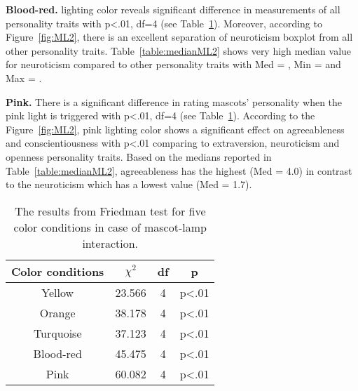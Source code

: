 \par\textbf{Blood-red.}
lighting color reveals significant difference in measurements of all personality traits
with p<.01, df=4 (see Table~\ref{table:friedmanML2}).
Moreover, according to Figure~\ref{fig:ML2}, there is an excellent separation of neuroticism boxplot from all other personality traits.
Table~\ref{table:medianML2} shows very high median value for neuroticism compared to other
personality traits with Med = , Min = and Max = .

\par\textbf{Pink.}
There is a significant difference in rating mascots' personality when the pink light is
triggered with p<.01, df=4 (see Table~\ref{table:friedmanML2}).
According to the Figure~\ref{fig:ML2}, pink lighting color shows a significant effect on agreeableness
and conscientiousness with p<.01 comparing to extraversion, neuroticism and openness personality traits.
Based on the medians reported in Table~\ref{table:medianML2}, agreeableness has the
highest (Med = 4.0) in contrast to the neuroticism which has a lowest value (Med = 1.7).

\begin{table}[H]
    \renewcommand{\arraystretch}{1}
    \begin{center}
        \begin{tabular}{|c|c|c|c|}
            \hline
            \textbf{Color conditions} & \textbf{$\chi^2$} & \textbf{df} & \textbf{p} \\
            \hline
            Yellow &23.566 &4 &p<.01 \\
            \hline
            Orange &38.178 &4 &p<.01\\
            \hline
            Turquoise &37.123 &4 &p<.01 \\
            \hline
            Blood-red &45.475 &4 &p<.01 \\
            \hline
            Pink &60.082 &4 &p<.01 \\
            \hline
        \end{tabular}
        \caption{The results from Friedman test for five color conditions in case of mascot-lamp interaction.}
        \label{table:friedmanML2}
    \end{center}
\end{table}

